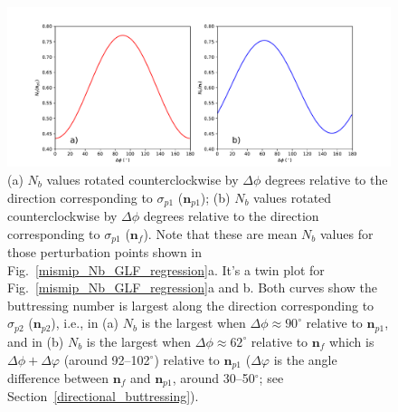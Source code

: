 \documentclass[tc, manuscript]{copernicus}
\begin{document}

\begin{figure}
	\centering
	\includegraphics[width=1\linewidth]{./figs/Nb_Deltaphi.pdf}
	\caption{(a) $N_b$ values rotated counterclockwise by $\Delta\phi$ degrees relative to the direction corresponding to $\sigma_{p1}$ ($\mathbf{n}_{p1}$); (b) $N_b$ values rotated counterclockwise by $\Delta\phi$ degrees relative to the direction corresponding to $\sigma_{p1}$ ($\mathbf{n}_{f}$). Note that these are mean $N_b$ values for those perturbation points shown in Fig.~\ref{mismip_Nb_GLF_regression}a. It's a twin plot for Fig.~\ref{mismip_Nb_GLF_regression}a and b. Both curves show the buttressing number is largest along the direction corresponding to $\sigma_{p2}$ ($\mathbf{n}_{p2}$), i.e., in (a) $N_b$ is the largest when $\Delta\phi\approx 90^\circ$ relative to $\mathbf{n}_{p1}$, and in (b) $N_b$ is the largest when $\Delta\phi\approx 62^\circ$ relative to $\mathbf{n}_{f}$ which is $\Delta\phi+\Delta\varphi$ (around 92--102$^\circ$) relative to $\mathbf{n}_{p1}$ ($\Delta\varphi$ is the angle difference between $\mathbf{n}_{f}$ and $\mathbf{n}_{p1}$, around 30--50$^\circ$; see Section~\ref{directional_buttressing}).}
	\label{Nb_Deltaphi}
\end{figure}
\end{document}
